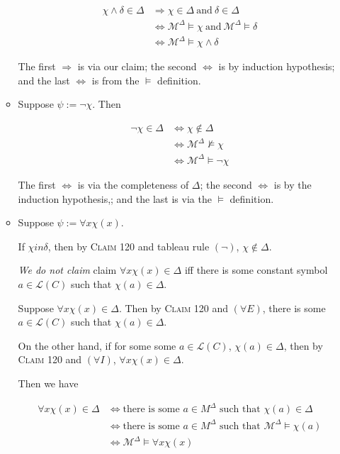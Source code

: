 \documentclass[a4paper]{article}
\newcommand{\MODEL}{\mathcal{M}}
\newcommand{\LANGUAGE}{\mathcal{L}}
\begin{document}
\begin{enumerate}
\begin{itemize}
    \begin{align*}
        \chi \wedge \delta \in \Delta & \Rightarrow  \chi \in \Delta\ \text{and} \ \delta \in \Delta\\
        & \Leftrightarrow \MODEL^{\Delta} \models \chi\ \text{and} \ \MODEL^{\Delta} \models \delta\\
        & \Leftrightarrow \MODEL^{\Delta} \models \chi \wedge \delta
    \end{align*}

    The first $\Rightarrow$ is via our claim; the second $\Leftrightarrow$ is by induction hypothesis; and the last $\Leftrightarrow$ is from the $\models$ definition.

    \item Suppose $\psi := \neg \chi$.  Then

    \begin{align*}
        \neg \chi \in \Delta & \Leftrightarrow  \chi \not\in \Delta\\
        & \Leftrightarrow \MODEL^{\Delta} \not\models \chi\\
        & \Leftrightarrow \MODEL^{\Delta} \models \neg\chi
    \end{align*}


    The first $\Leftrightarrow$ is via the completeness of $\Delta$; the second $\Leftrightarrow$ is by the induction hypothesis,; and the last is via the $\models$ definition.

    \item Suppose $\psi := \forall x \chi (x)$.

        If $\chi in \delta$, then by \textsc{Claim 120} and tableau rule $(\neg)$, $\chi \not\in \Delta$.
    
        \textit{We do not claim} claim $\forall x \chi (x) \in \Delta$ iff there is some constant symbol $a \in \LANGUAGE (C)$ such that $\chi(a) \in \Delta$.

        Suppose $\forall x \chi (x) \in \Delta$. Then by \textsc{Claim 120} and $(\forall E)$, there is some $a \in \LANGUAGE (C)$ such that $\chi(a) \in \Delta$.


        On the other hand, if for some some $a \in \LANGUAGE(C)$, $\chi (a) \in \Delta$, then by \textsc{Claim 120} and $(\forall I)$, $\forall x \chi (x) \in \Delta$. 

        Then we have

    \begin{align*}
        \forall x \chi (x)\in \Delta & \Leftrightarrow \text{there is some } a \in M^{\Delta} \text{ such that } \chi(a) \in \Delta\\
        & \Leftrightarrow \text{there is some } a \in M^{\Delta} \text{ such that } \MODEL^{\Delta} \models \chi (a)\\
        & \Leftrightarrow \MODEL^{\Delta} \models \forall x \chi (x)
    \end{align*}


\end{itemize}
\end{enumerate}
\end{document}

